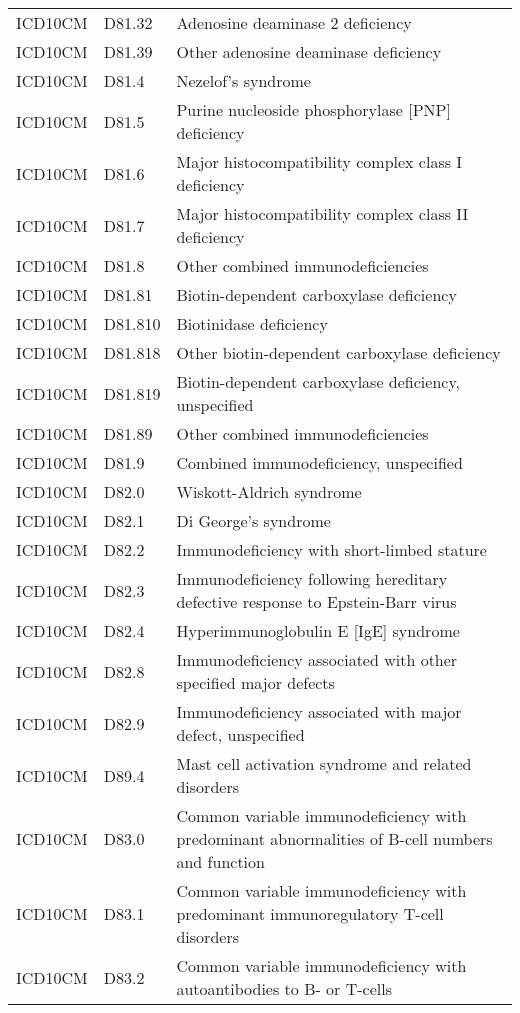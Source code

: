 \begin{longtable}{p{}p{}p{}}
  ICD10CM & D81.32 & Adenosine deaminase 2 deficiency \\ 
  ICD10CM & D81.39 & Other adenosine deaminase deficiency \\ 
  ICD10CM & D81.4 & Nezelof's syndrome \\ 
  ICD10CM & D81.5 & Purine nucleoside phosphorylase [PNP] deficiency \\ 
  ICD10CM & D81.6 & Major histocompatibility complex class I deficiency \\ 
  ICD10CM & D81.7 & Major histocompatibility complex class II deficiency \\ 
  ICD10CM & D81.8 & Other combined immunodeficiencies \\ 
  ICD10CM & D81.81 & Biotin-dependent carboxylase deficiency \\ 
  ICD10CM & D81.810 & Biotinidase deficiency \\ 
  ICD10CM & D81.818 & Other biotin-dependent carboxylase deficiency \\ 
  ICD10CM & D81.819 & Biotin-dependent carboxylase deficiency, unspecified \\ 
  ICD10CM & D81.89 & Other combined immunodeficiencies \\ 
  ICD10CM & D81.9 & Combined immunodeficiency, unspecified \\ 
  ICD10CM & D82.0 & Wiskott-Aldrich syndrome \\ 
  ICD10CM & D82.1 & Di George's syndrome \\ 
  ICD10CM & D82.2 & Immunodeficiency with short-limbed stature \\ 
  ICD10CM & D82.3 & Immunodeficiency following hereditary defective response to Epstein-Barr virus \\ 
  ICD10CM & D82.4 & Hyperimmunoglobulin E [IgE] syndrome \\ 
  ICD10CM & D82.8 & Immunodeficiency associated with other specified major defects \\ 
  ICD10CM & D82.9 & Immunodeficiency associated with major defect, unspecified \\ 
  ICD10CM & D89.4 & Mast cell activation syndrome and related disorders \\ 
  ICD10CM & D83.0 & Common variable immunodeficiency with predominant abnormalities of B-cell numbers and function \\ 
  ICD10CM & D83.1 & Common variable immunodeficiency with predominant immunoregulatory T-cell disorders \\ 
  ICD10CM & D83.2 & Common variable immunodeficiency with autoantibodies to B- or T-cells \\ 

\end{longtable}
